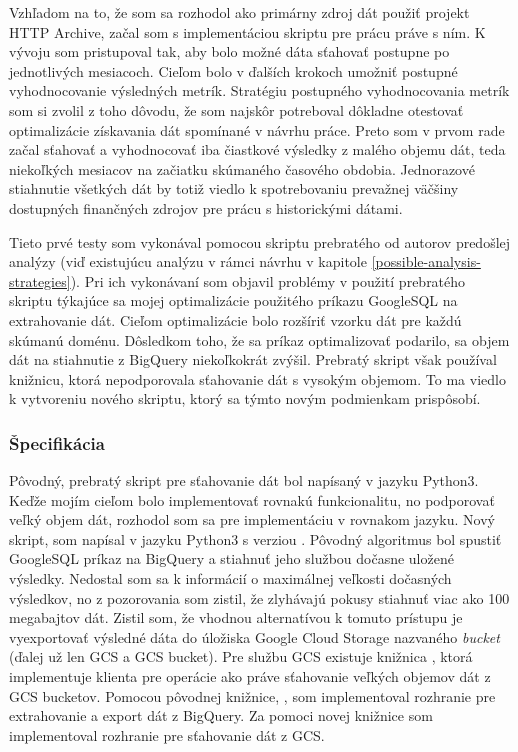 Vzhľadom na to, že som sa rozhodol ako primárny zdroj dát použiť projekt HTTP Archive, začal som s implementáciou skriptu pre prácu práve s ním.
K vývoju som pristupoval tak, aby bolo možné dáta sťahovať postupne po jednotlivých mesiacoch. 
Cieľom bolo v ďalších krokoch umožniť postupné vyhodnocovanie výsledných metrík. 
Stratégiu postupného vyhodnocovania metrík som si zvolil z toho dôvodu, že som najskôr potreboval dôkladne otestovať optimalizácie získavania dát spomínané v návrhu práce.
Preto som v prvom rade začal sťahovať a vyhodnocovať iba čiastkové výsledky z malého objemu dát, teda niekoľkých mesiacov na začiatku skúmaného časového obdobia.
Jednorazové stiahnutie všetkých dát by totiž viedlo k spotrebovaniu prevažnej väčšiny dostupných finančných zdrojov pre prácu s historickými dátami.

Tieto prvé testy som vykonával pomocou skriptu prebratého od autorov predošlej analýzy (viď existujúcu analýzu v rámci návrhu v kapitole \ref{possible-analysis-strategies}).
Pri ich vykonávaní som objavil problémy v použití prebratého skriptu týkajúce sa mojej optimalizácie použitého príkazu GoogleSQL na extrahovanie dát.
Cieľom optimalizácie bolo rozšíriť vzorku dát pre každú skúmanú doménu.
Dôsledkom toho, že sa príkaz optimalizovať podarilo, sa objem dát na stiahnutie z BigQuery niekoľkokrát zvýšil.
Prebratý skript však používal knižnicu, ktorá nepodporovala sťahovanie dát s vysokým objemom.
To ma viedlo k vytvoreniu nového skriptu, ktorý sa týmto novým podmienkam prispôsobí.

\subsubsection{Špecifikácia}

Pôvodný, prebratý skript pre sťahovanie dát bol napísaný v jazyku Python3.
Keďže mojím cieľom bolo implementovať rovnakú funkcionalitu, no podporovať veľký objem dát, rozhodol som sa pre implementáciu v rovnakom jazyku.
Nový skript,  som napísal v jazyku Python3 s verziou .
Pôvodný algoritmus bol spustiť GoogleSQL príkaz na BigQuery a stiahnuť jeho službou dočasne uložené výsledky.
Nedostal som sa k informácií o maximálnej veľkosti dočasných výsledkov, no z pozorovania som zistil, že zlyhávajú pokusy stiahnuť viac ako 100 megabajtov dát.
Zistil som, že vhodnou alternatívou k tomuto prístupu je vyexportovať výsledné dáta do úložiska Google Cloud Storage nazvaného \textit{bucket} (ďalej už len GCS a GCS bucket).
Pre službu GCS existuje knižnica , ktorá implementuje klienta pre operácie ako práve sťahovanie veľkých objemov dát z GCS bucketov.
Pomocou pôvodnej knižnice, , som implementoval rozhranie pre extrahovanie a export dát z BigQuery.
Za pomoci novej knižnice som implementoval rozhranie pre sťahovanie dát z GCS.

